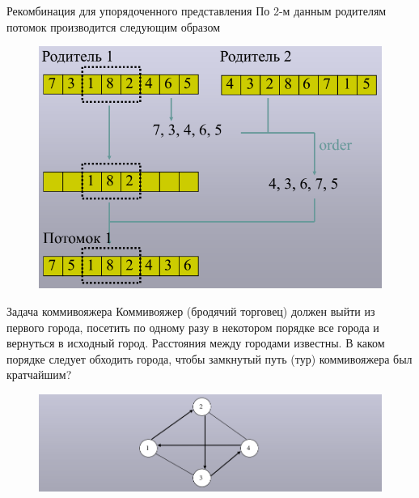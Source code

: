 \documentclass{beamer}
\begin{document}
\begin{frame}{Рекомбинация для упорядоченного представления}
По 2-м данным родителям потомок производится следующим образом
\begin{figure}[h]
\centering
\includegraphics[scale=0.4]{images/lec04-pic35.png}
\end{figure}
\end{frame}

\begin{frame}{Задача коммивояжера}
Коммивояжер (бродячий торговец) должен выйти из первого города,
посетить по одному разу в некотором порядке все города и вернуться в
исходный город. Расстояния между городами известны. В каком порядке следует обходить города, чтобы замкнутый путь (тур) коммивояжера был кратчайшим?
\begin{figure}[h]
\centering
\includegraphics[scale=0.4]{images/lec04-pic36.png}
\end{figure}
\end{frame}
\end{document}
